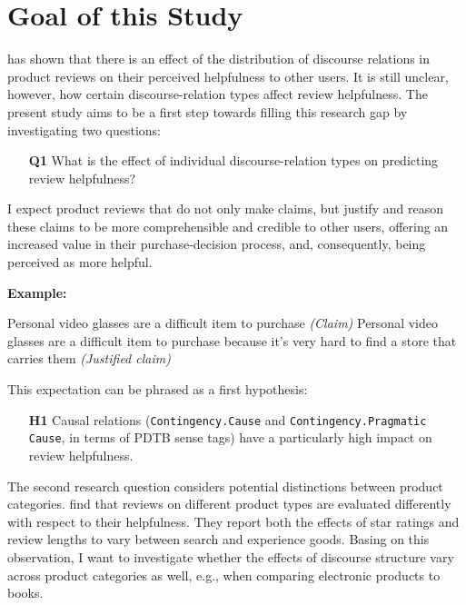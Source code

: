 \documentclass[
    a4paper,%
    12pt,%
    oneside,%
    toc=bibliography,
    final,
]{scrartcl}
\begin{document}
\section{Goal of this Study}
\label{sec:goal}

\citet{Golly2017} has shown that there is an effect of the distribution of discourse relations in product reviews on their perceived helpfulness to other users. It is still unclear, however, how certain discourse-relation types affect review helpfulness. The present study aims to be a first step towards filling this research gap by investigating two questions:

\begin{enumerate}[rightmargin=1cm]
\item[\textbf{Q1}] What is the effect of individual discourse-relation types on predicting review helpfulness?
\end{enumerate}

I expect product reviews that do not only make claims, but justify and reason these claims to be more comprehensible and credible to other users, offering an increased value in their purchase-decision process, and, consequently, being perceived as more helpful.

\pagebreak
\textbf{Example:}
\vspace{-1em}

\begin{exe}
\ex Personal video glasses are a difficult item to purchase \textit{(Claim)}
\ex Personal video glasses are a difficult item to purchase because it’s very hard to find a store that carries them \textit{(Justified claim)}
\end{exe}
\vspace{-.5em}

This expectation can be phrased as a first hypothesis:

\begin{enumerate}[rightmargin=1cm]
\item[\textbf{H1}] Causal relations (\lstinline|Contingency.Cause| and \lstinline|Contingency.Pragmatic Cause|, in terms of PDTB sense tags) have a particularly high impact on review helpfulness.
\end{enumerate}

The second research question considers potential distinctions between product categories. \citet{MudambiSchuff2010} find that reviews on different product types are evaluated differently with respect to their helpfulness. They report both the effects of star ratings and review lengths to vary between search and experience goods. Basing on this observation, I want to investigate whether the effects of discourse structure vary across product categories as well, e.g., when comparing electronic products to books.
\end{document}
